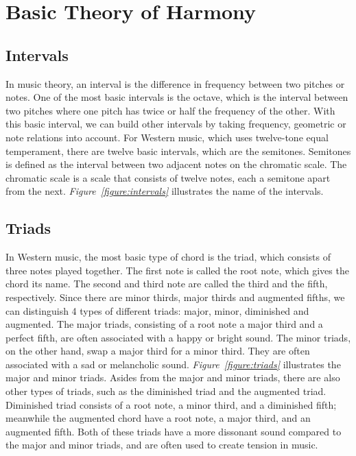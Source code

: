 \documentclass[a4paper, 9pt, twocolumn]{extarticle}
\begin{document}
\section{Basic Theory of Harmony}
\label{section:theory}
\subsection{Intervals}
\label{subsection:intervals}
In music theory, an interval is the difference in frequency between two pitches or notes. One of the most basic intervals is the octave, which is the interval between two pitches where one pitch has twice or half the frequency of the other.
With this basic interval, we can build other intervals by taking frequency, geometric or note relations into account.
For Western music, which uses twelve-tone equal temperament, there are twelve basic intervals, which are the semitones. Semitones is defined as the interval between two adjacent notes on the chromatic scale. The chromatic scale is a scale that consists of twelve notes, each a semitone apart from the next. \emph{Figure~\ref{figure:intervals}} illustrates the name of the intervals.

\subsection{Triads}
\label{subsection:triads}
In Western music, the most basic type of chord is the triad, which consists of three notes played together.
The first note is called the root note, which gives the chord its name. The second and third note are called the third and the fifth, respectively. Since there are minor thirds, major thirds and augmented fifths, we can distinguish 4 types of different triads: major, minor, diminished and augmented.
The major triads, consisting of a root note a major third and a perfect fifth, are often associated with a happy or bright sound. The minor triads, on the other hand, swap a major third for a minor third. They are often associated with a sad or melancholic sound. \emph{Figure~\ref{figure:triads}} illustrates the major and minor triads. Asides from the major and minor triads, there are also other types of triads, such as the diminished triad and the augmented triad.
Diminished triad consists of a root note, a minor third, and a diminished fifth; meanwhile the augmented chord have a root note, a major third, and an augmented fifth. Both of these triads have a more dissonant sound compared to the major and minor triads, and are often used to create tension in music.
\end{document}
